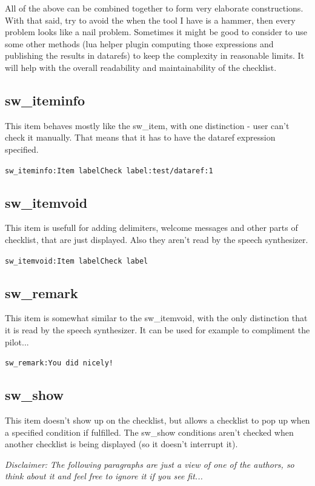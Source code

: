 \documentclass[11pt,parskip=half,a4paper]{scrartcl}
\newcommand\textstyleSourceText[1]{\texttt{#1}}
\newcommand\textstyleEmphasis[1]{\textit{#1}}
\begin{document}
All of the above can be combined together to form very elaborate constructions. With that said, try to avoid the
{\textquotedbl}when the tool I have is a hammer, then every problem looks like a nail{\textquotedbl} problem. Sometimes it might be good to consider to use some other methods (lua helper plugin computing those expressions and publishing the results in datarefs) to keep the complexity in reasonable limits. It will help with the overall readability and maintainability of the checklist.

\subsection[sw\_iteminfo]{sw\_iteminfo}
This item behaves mostly like the sw\_item, with one distinction - user can't check it manually. That means that it has to have the dataref expression specified.

\textstyleSourceText{sw\_iteminfo:Item label{\textbar}Check label:test/dataref:1}

\subsection{sw\_itemvoid}
This item is usefull for adding delimiters, welcome messages and other parts of checklist, that are just displayed. Also they aren't read by the speech synthesizer.

\textstyleSourceText{sw\_itemvoid:Item label{\textbar}Check label}

\subsection{sw\_remark}
This item is somewhat similar to the sw\_itemvoid, with the only distinction that it is read by the speech synthesizer. It can be used for example to compliment the pilot...

\textstyleSourceText{sw\_remark:You did nicely!}

\subsection{sw\_show}
This item doesn't show up on the checklist, but allows a checklist to pop up when a specified condition if fulfilled. The sw\_show conditions aren't checked when another checklist is being displayed (so it doesn't interrupt it).

\textstyleEmphasis{Disclaimer:} \textstyleEmphasis{The following paragraphs are just a view of one of the authors, so think about it and feel free to} \textstyleEmphasis{ignore it if you see fit...}
\end{document}
